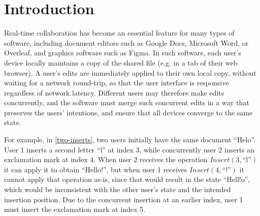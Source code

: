 \documentclass[sigplan,10pt]{acmart}
\begin{document}

\maketitle

\section{Introduction}\label{introduction}

Real-time collaboration has become an essential feature for many types of software, including document editors such as Google Docs, Microsoft Word, or Overleaf, and graphics software such as Figma.
In such software, each user's device locally maintains a copy of the shared file (e.g. in a tab of their web browser).
A user's edits are immediately applied to their own local copy, without waiting for a network round-trip, so that the user interface is responsive regardless of network latency.
Different users may therefore make edits concurrently, and the software must merge such concurrent edits in a way that preserves the users' intentions, and ensure that all devices converge to the same state.

For example, in \autoref{two-inserts}, two users initially have the same document ``Helo''.
User 1 inserts a second letter ``l'' at index 3, while concurrently user 2 inserts an exclamation mark at index 4.
When user 2 receives the operation $\mathit{Insert}(3, \text{``l''})$ it can apply it to obtain ``Hello!'', but when user 1 receives $\mathit{Insert}(4, \text{``!''})$ it cannot apply that operation as-is, since that would result in the state ``Hell!o'', which would be inconsistent with the other user's state and the intended insertion position.
Due to the concurrent insertion at an earlier index, user 1 must insert the exclamation mark at index 5.
\end{document}
